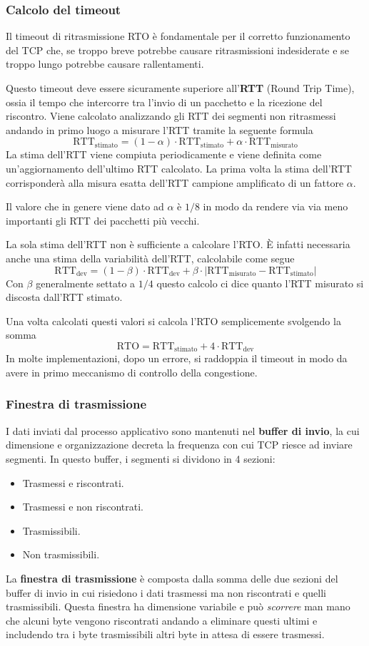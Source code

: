\subsubsection{Calcolo del timeout}
Il timeout di ritrasmissione RTO è fondamentale per il corretto funzionamento del TCP che, se
troppo breve potrebbe causare ritrasmissioni indesiderate e se troppo lungo potrebbe causare
rallentamenti.

Questo timeout deve essere sicuramente superiore all'\textbf{RTT} (Round Trip Time), ossia il
tempo che intercorre tra l'invio di un pacchetto e la ricezione del riscontro. Viene calcolato
analizzando gli RTT dei segmenti non ritrasmessi andando in primo luogo a misurare l'RTT tramite 
la seguente formula
\[
	\text{RTT}_\text{stimato} = (1 - \alpha) \cdot \text{RTT}_\text{stimato} +
	\alpha \cdot \text{RTT}_\text{misurato}
\]
La stima dell'RTT viene compiuta periodicamente e viene definita come un'aggiornamento dell'ultimo
RTT calcolato. La prima volta la stima dell'RTT corrisponderà alla misura esatta dell'RTT campione
amplificato di un fattore $\alpha$.

Il valore che in genere viene dato ad $\alpha$ è $1/8$ in modo da rendere via via meno importanti 
gli RTT dei pacchetti più vecchi.

La sola stima dell'RTT non è sufficiente a calcolare l'RTO. \`E infatti necessaria anche una stima
della variabilità dell'RTT, calcolabile come segue
\[
	\text{RTT}_\text{dev} = (1 - \beta) \cdot \text{RTT}_\text{dev} + 
	\beta \cdot |\text{RTT}_\text{misurato} - \text{RTT}_\text{stimato}|
\]
Con $\beta$ generalmente settato a $1/4$ questo calcolo ci dice quanto l'RTT misurato si discosta
dall'RTT stimato.

Una volta calcolati questi valori si calcola l'RTO semplicemente svolgendo la somma 
\[ \text{RTO} = \text{RTT}_\text{stimato} + 4 \cdot \text{RTT}_\text{dev} \]
In molte implementazioni, dopo un errore, si raddoppia il timeout in modo da avere in primo
meccanismo di controllo della congestione.

\subsubsection{Finestra di trasmissione}
I dati inviati dal processo applicativo sono mantenuti nel \textbf{buffer di invio}, la cui
dimensione e organizzazione decreta la frequenza con cui TCP riesce ad inviare segmenti. In questo
buffer, i segmenti si dividono in 4 sezioni:
\begin{itemize}
	\item Trasmessi e riscontrati.
	\item Trasmessi e non riscontrati.
	\item Trasmissibili.
	\item Non trasmissibili.
\end{itemize}
La \textbf{finestra di trasmissione} è composta dalla somma delle due sezioni del buffer di invio
in cui risiedono i dati trasmessi ma non riscontrati e quelli trasmissibili. Questa finestra ha 
dimensione variabile e può \emph{scorrere} man mano che alcuni byte vengono riscontrati andando a
eliminare questi ultimi e includendo tra i byte trasmissibili altri byte in attesa di essere
trasmessi.

